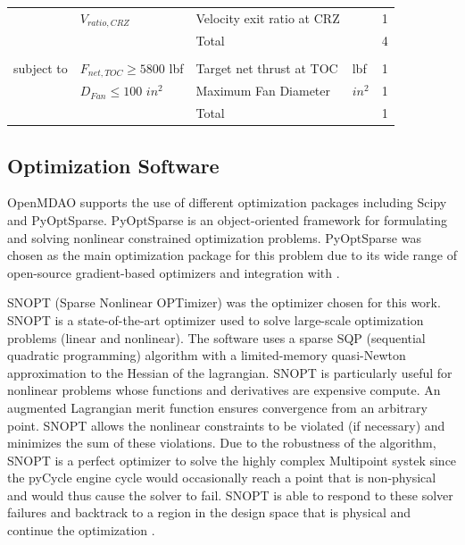 \documentclass[conf]{new-aiaa}
\begin{document}
\begin{table}[h]
\begin{tabular}{r l l l l}
                        & $V_{ratio,CRZ}$             & Velocity exit ratio at CRZ                 &                 & 1        \\
        \cline{3-5}
                        &                             & Total                                      &                 & 4        \\
                        &                             &                                            &                 &          \\
        subject to      & $F_{net,TOC} \geq 5800$ lbf & Target net thrust at TOC                   & lbf             & 1        \\
                        & $D_{Fan} \leq 100$ $in^2$   & Maximum Fan Diameter                       & $in^2$          & 1        \\
        \cline{3-5}
                        &                             & Total                                      &                 & 1        \\
        \bottomrule
    \end{tabular}
    \label{tab:opt_problem}
\end{table}



\subsection{Optimization Software}
OpenMDAO supports the use of different optimization packages including Scipy and PyOptSparse.
PyOptSparse is an object-oriented framework for formulating and solving nonlinear constrained optimization problems.
PyOptSparse was chosen as the main optimization package for this problem due to its wide range of open-source gradient-based optimizers and integration with  \cite{Wu2020a}.

SNOPT (Sparse Nonlinear OPTimizer) was the optimizer chosen for this work.
SNOPT is a state-of-the-art optimizer used to solve large-scale optimization problems (linear and nonlinear).
The software uses a sparse SQP (sequential quadratic programming) algorithm with a limited-memory quasi-Newton approximation to the Hessian of the lagrangian.
SNOPT is particularly useful for nonlinear problems whose functions and derivatives are expensive compute.
An augmented Lagrangian merit function ensures convergence from an arbitrary point.
SNOPT allows the nonlinear constraints to be violated (if necessary) and minimizes the sum of these violations.
Due to the robustness of the algorithm, SNOPT is a perfect optimizer to solve the highly complex Multipoint systek since the pyCycle engine cycle would occasionally reach a point that is non-physical and would thus cause the solver to fail.
SNOPT is able to respond to these solver failures and backtrack to a region in the design space that is physical and continue the optimization \cite{Gill2005a}.
\end{document}

